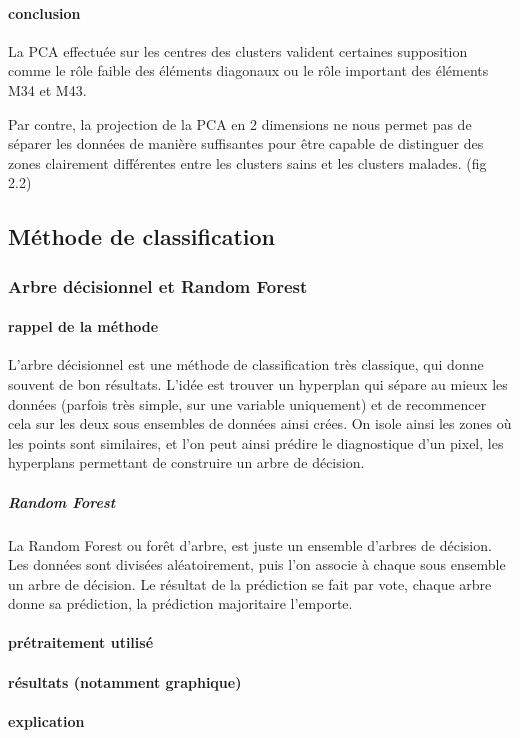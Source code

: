 \documentclass[a4paper,10pt]{report}
\begin{document}
\paragraph{conclusion}
La PCA effectuée sur les centres des clusters valident certaines supposition comme le rôle faible des éléments diagonaux ou le rôle important des éléments M34 et M43.

Par contre, la projection de la PCA en 2 dimensions ne nous permet pas de séparer les données de manière suffisantes pour être capable de distinguer des zones clairement différentes entre les clusters sains et les clusters malades. (fig 2.2)
\subsection{Méthode de classification}

\subsubsection{Arbre décisionnel et Random Forest}
\paragraph{rappel de la méthode }
L'arbre décisionnel est une méthode de classification très classique, qui donne souvent de bon résultats. L'idée est trouver un hyperplan qui sépare au mieux les données (parfois très simple, sur une variable uniquement) et de recommencer cela sur les deux sous ensembles de données ainsi crées. On isole ainsi les zones où les points sont similaires, et l'on peut ainsi prédire le diagnostique d'un pixel, les hyperplans permettant de construire un arbre de décision.
\subparagraph{Random Forest}
La Random Forest ou forêt d'arbre, est juste un ensemble d'arbres de décision. Les données sont divisées aléatoirement, puis l'on associe à chaque sous ensemble un arbre de décision. Le résultat de la prédiction se fait par vote, chaque arbre donne sa prédiction, la prédiction majoritaire l'emporte.
\paragraph{prétraitement utilisé}
\paragraph{résultats (notamment graphique)}
\paragraph{explication}
\end{document}
